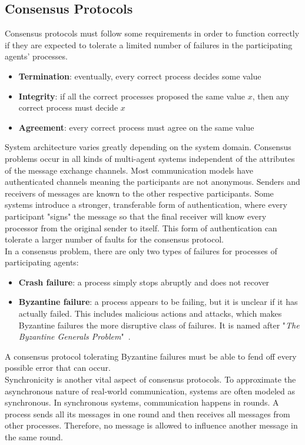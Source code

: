 \subsection{Consensus Protocols}
Consensus protocols must follow some requirements in order to function correctly if they are expected to tolerate a limited number of failures in the participating agents' processes.
\begin{itemize}
	\item \textbf{Termination}: eventually, every correct process decides some value
	\item \textbf{Integrity}: if all the correct processes proposed the same value $x$, then any correct process must decide $x$
	\item \textbf{Agreement}: every correct process must agree on the same value
\end{itemize}
System architecture varies greatly depending on the system domain. Consensus problems occur in all kinds of multi-agent systems independent of the attributes of the message exchange channels. Most communication models have authenticated channels meaning the participants are not anonymous. Senders and receivers of messages are known to the other respective participants. Some systems introduce a stronger, transferable form of authentication, where every participant "signs" the message so that the final receiver will know every processor from the original sender to itself. This form of authentication can tolerate a larger number of faults for the consensus protocol.~\cite{Coulouris2001}\\
In a consensus problem, there are only two types of failures for processes of participating agents:
\begin{itemize}
	\item \textbf{Crash failure}: a process simply stops abruptly and does not recover
	\item \textbf{Byzantine failure}: a process appears to be failing, but it is unclear if it has actually failed. This includes malicious actions and attacks, which makes Byzantine failures the more disruptive class of failures. It is named after "\textit{The Byzantine Generals Problem}"~\cite{Lamport1982}.
\end{itemize}
A consensus protocol tolerating Byzantine failures must be able to fend off every possible error that can occur.~\cite{Coulouris2001}\\
Synchronicity is another vital aspect of consensus protocols. To approximate the asynchronous nature of real-world communication, systems are often modeled as synchronous. In synchronous systems, communication happens in rounds. A process sends all its messages in one round and then receives all messages from other processes. Therefore, no message is allowed to influence another message in the same round.~\cite{Coulouris2001}\\
